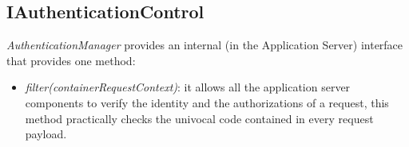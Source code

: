 \subsection{IAuthenticationControl}
\textit{AuthenticationManager} provides an internal (in the Application Server) interface that provides one method:
\label{subsect:IAuthenticationControl}
\begin{itemize}
	\item \textit{filter(containerRequestContext)}: it allows all the application server components to verify the identity and the authorizations of a request, this method practically checks the univocal code contained in every request payload.
\end{itemize}

